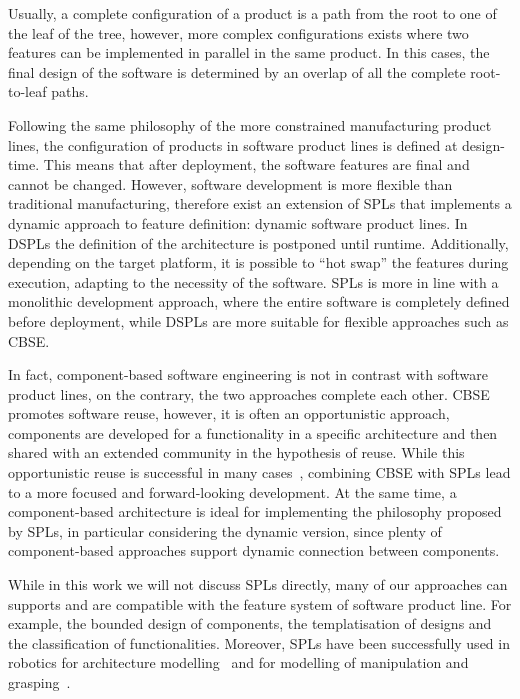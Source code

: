 Usually, a complete configuration of a product is a path from the root to one of the leaf of the tree, however, more complex configurations exists where two features can be implemented in parallel in the same product. In this cases, the final design of the software is determined by an overlap of all the complete root-to-leaf paths.

Following the same philosophy of the more constrained manufacturing product lines, the configuration of products in software product lines is defined at design-time. This means that after deployment, the software features are final and cannot be changed. However, software development is more flexible than traditional manufacturing, therefore exist an extension of SPLs that implements a dynamic approach to feature definition: dynamic software product lines. In DSPLs the definition of the architecture is postponed until runtime. Additionally, depending on the target platform, it is possible to ``hot swap'' the features during execution, adapting to the necessity of the software. SPLs is more in line with a monolithic development approach, where the entire software is completely defined before deployment, while DSPLs are more suitable for flexible approaches such as CBSE.

In fact, component-based software engineering is not in contrast with software product lines, on the contrary, the two approaches complete each other. CBSE promotes software reuse, however, it is often an opportunistic approach, components are developed for a functionality in a specific architecture and then shared with an extended community in the hypothesis of reuse. While this opportunistic reuse is successful in many cases~\cite{jansen2008pragmatic}, combining CBSE with SPLs lead to a more focused and forward-looking development. At the same time, a component-based architecture is ideal for implementing the philosophy proposed by SPLs, in particular considering the dynamic version, since plenty of component-based approaches support dynamic connection between components.

While in this work we will not discuss SPLs directly, many of our approaches can supports and are compatible with the feature system of software product line. For example, the bounded design of components, the templatisation of designs and the classification of functionalities. Moreover, SPLs have been successfully used in robotics for architecture modelling~\cite{gherardi2014modeling, brugali2016hyperflex} and for modelling of manipulation and grasping~\cite{baumgartl2013towards}.
 

